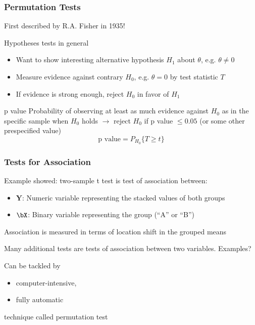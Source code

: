 \begin{frame}
	\frametitle{Permutation Tests}
	First described by R.A. Fisher in 1935!
	
	\vfill
	
	\begin{block}{Hypotheses tests in general}
		\begin{itemize}
			\item Want to show interesting alternative hypothesis $H_1$ about $\theta$, e.g. $\theta \ne 0$
			\item Measure evidence against contrary $H_0$, e.g. $\theta = 0$ by test statistic $T$
			\item If evidence is strong enough, reject $H_0$ in favor of $H_1$
		\end{itemize}
	\end{block}
	
	\begin{block}{p value}
		Probability of observing at least as much evidence against $H_0$ as in the specific sample when $H_0$ holds $\rightarrow$ reject $H_0$ if p value $\le 0.05$ (or some other prespecified value)
		$$
			\text{p value} = P_{H_0}\{T \ge t\}
		$$
	\end{block}
	
	\begin{example}
	\end{example}
\end{frame}

\begin{frame}
	\frametitle{Tests for Association}
	
	Example showed: two-sample t test is test of association between:
	\begin{itemize}
		\item $\boldsymbol Y$: Numeric variable representing the stacked values of \alert{both} groups
		\item $\bX$: Binary variable representing the group (``A'' or ``B'')
	\end{itemize}
	
	Association is measured in terms of location shift in the grouped means
	
	\vfill
	
	Many additional tests are tests of association between two variables. Examples?
	
	\vfill
	
	Can be tackled by 
	\begin{itemize}
		\item computer-intensive,
		\item fully automatic
	\end{itemize}
	technique called \alert{permutation test}
\end{frame}

